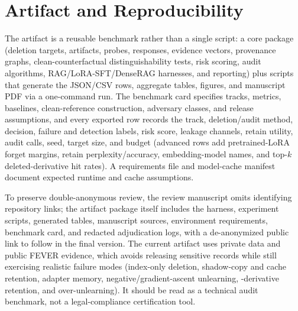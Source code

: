 \section{Artifact and Reproducibility}

The artifact is a reusable benchmark rather than a single script: a core package (deletion targets, artifacts, probes, responses, evidence vectors, provenance graphs, clean-counterfactual distinguishability tests, risk scoring, audit algorithms, RAG/LoRA-SFT/DenseRAG harnesses, and reporting) plus scripts that generate the JSON/CSV rows, aggregate tables, figures, and manuscript PDF via a one-command run. The benchmark card specifies tracks, metrics, baselines, clean-reference construction, adversary classes, and release assumptions, and every exported row records the track, deletion/audit method, decision, failure and detection labels, risk score, leakage channels, retain utility, audit calls, seed, target size, and budget (advanced rows add pretrained-LoRA forget margins, retain perplexity/accuracy, embedding-model names, and top-$k$ deleted-derivative hit rates). A requirements file and model-cache manifest document expected runtime and cache assumptions.

To preserve double-anonymous review, the review manuscript omits identifying repository links; the artifact package itself includes the harness, experiment scripts, generated tables, manuscript sources, environment requirements, benchmark card, and redacted adjudication logs, with a de-anonymized public link to follow in the final version. The current artifact uses private data and public FEVER evidence, which avoids releasing sensitive records while still exercising realistic failure modes (index-only deletion, shadow-copy and cache retention, adapter memory, negative/gradient-ascent unlearning, -derivative retention, and over-unlearning). It should be read as a technical audit benchmark, not a legal-compliance certification tool.
